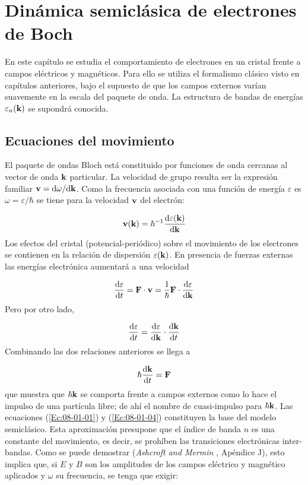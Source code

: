 \chapter{Dinámica semiclásica de electrones de Boch} \label{Ch:08}

En este capítulo se estudia el comportamiento de electrones en un cristal frente a campos eléctricos y magnéticos. Para ello se utiliza el formalismo clásico visto en capítulos anteriores, bajo el supuesto de que los campos externos varían suavemente en la escala del paquete de onda. La estructura de bandas de energías $\varepsilon_n (\mathbf{k})$ se supondrá conocida.

\section{Ecuaciones del movimiento}

El paquete de ondas Bloch está constituido por funciones de onda cercanas al vector de onda $\mathbf{k}$ particular. La velocidad de grupo resulta ser la expresión familiar $\mathbf{v}=\mathrm{d} \omega / \mathrm{d} \mathbf{k}$. Como la frecuencia asociada con una función de energía $\varepsilon$ es $\omega = \varepsilon/\hbar$ se tiene para la velocidad $\mathbf{v}$ del electrón:

\begin{equation}
	\mathbf{v} (\mathbf{k}) = \hbar^{-1} \frac{\mathrm{d} \varepsilon(\mathbf{k})}{\mathrm{d} \mathbf{k}} \label{Ec:08-01-01}
\end{equation}
Los efectos del cristal (potencial-periódico) sobre el movimiento de los electrones se contienen en la relación de dispersión $\varepsilon(\mathbf{k})$. En presencia de fuerzas externas las energías electrónica aumentará a una velocidad 

\begin{equation}
	\frac{\mathrm{d} \varepsilon}{\mathrm{d} t} = \mathbf{F} \cdot \mathbf{v} = \frac{1}{\hbar} \mathbf{F} \cdot \frac{\mathrm{d} \varepsilon}{\mathrm{d} \mathbf{k}}
\end{equation}
Pero por otro lado,

\begin{equation}
	\frac{\mathrm{d} \varepsilon}{\mathrm{d} t} = \frac{\mathrm{d} \varepsilon}{\mathrm{d} \mathbf{k}} \cdot \frac{\mathrm{d} \mathbf{k}}{\mathrm{d} t}
\end{equation}
Combinando las dos relaciones anteriores se llega a

\begin{equation}
	\hbar \frac{\mathrm{d} \mathbf{k}}{\mathrm{d} t} = \mathbf{F} \label{Ec:08-01-04}
\end{equation}	
que muestra que $\hbar \mathbf{k}$ se comporta frente a campos externos como lo hace el impulso de una partícula libre; de ahí el nombre de cuasi-impulso para $\hbar \mathbf{k}$. Las ecuaciones (\ref{Ec:08-01-01}) y (\ref{Ec:08-01-04}) constituyen la base del modelo semiclásico. Esta aproximación presupone que el índice de banda $n$ es una constante del movimiento, es decir, se prohíben las transiciones electrónicas inter-bandas. Como se puede demostrar (\textit{Ashcroft and Mermin} \cite{Mermin_Solid_State}, Apéndice J), esto implica que, si $E$ y $B$ son los amplitudes de los campos eléctrico y magnético aplicados y $\omega$ su frecuencia, se tenga que exigir:

